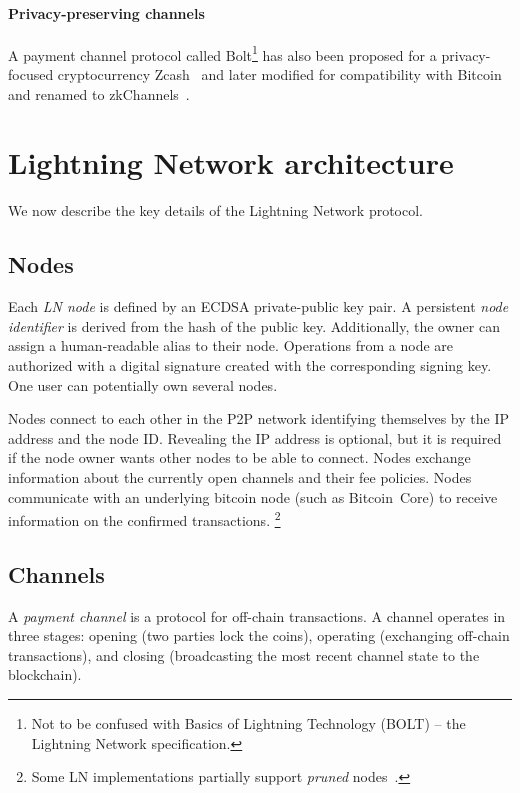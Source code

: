 \paragraph{Privacy-preserving channels}
A payment channel protocol called Bolt\footnote{Not to be confused with Basics of Lightning Technology (BOLT) -- the Lightning Network specification.} has also been proposed for a privacy-focused cryptocurrency Zcash~\cite{Green2017} and later modified for compatibility with Bitcoin and renamed to zkChannels~\cite{Akinyele2020}.



\section{Lightning Network architecture}
\label{sec:LightningOverview}

We now describe the key details of the Lightning Network protocol.

\subsection{Nodes}

Each \textit{LN node} is defined by an ECDSA private-public key pair.
A persistent \textit{node identifier} is derived from the hash of the public key. 
Additionally, the owner can assign a human-readable alias to their node.
Operations from a node are authorized with a digital signature created with the corresponding signing key.
One user can potentially own several nodes.

Nodes connect to each other in the P2P network identifying themselves by the IP address and the node ID.
Revealing the IP address is optional, but it is required if the node owner wants other nodes to be able to connect.
Nodes exchange information about the currently open channels and their fee policies.
Nodes communicate with an underlying bitcoin node (such as Bitcoin~Core) to receive information on the confirmed transactions.
\footnote{Some LN implementations partially support \textit{pruned} nodes~\cite{LNDInstall}.}


\subsection{Channels}

A \textit{payment channel} is a protocol for off-chain transactions.
A channel operates in three stages: opening (two parties lock the coins), operating (exchanging off-chain transactions), and closing (broadcasting the most recent channel state to the blockchain).


